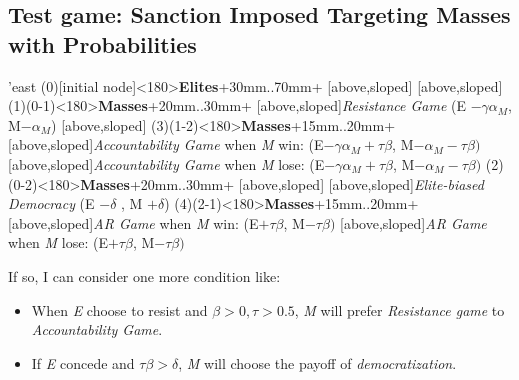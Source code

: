 \documentclass[11pt]{article}
\begin{document}
	\subsection*{Test game: Sanction Imposed Targeting Masses with Probabilities}
	\begin{istgame}[font=\footnotesize]
		\centering
		\setistgrowdirection'{east}
		\xtShowArrows
		\istroot(0)[initial node]<180>{\textbf{Elites}}+30mm..70mm+
		[above,sloped]  [above,sloped] \endist
		\istroot(1)(0-1)<180>{\textbf{Masses}}+20mm..30mm+
		[above,sloped]{\textit{Resistance Game} (E $- \gamma\alpha_{M}$, M$-\alpha_{M}$) }
		[above,sloped]{ }  \endist
		\istroot(3)(1-2)<180>{\textbf{Masses}}+15mm..20mm+
		[above,sloped]{\textit{Accountability Game} when \textit{M} win: (E$-\gamma\alpha_{M}+\tau\beta$, M$-\alpha_{M}-\tau\beta)$}
		[above,sloped]{\textit{Accountability Game} when \textit{M} lose: (E$-\gamma\alpha_{M}+\tau\beta$, M$-\alpha_{M}-\tau\beta)$} \endist
		\istroot(2)(0-2)<180>{\textbf{Masses}}+20mm..30mm+
		[above,sloped]{}
		[above,sloped]{\textit{Elite-biased Democracy} (E $-\delta$ , M $+ \delta$)} \endist
		\istroot(4)(2-1)<180>{\textbf{Masses}}+15mm..20mm+
		[above,sloped]{\textit{AR Game} when \textit{M} win: (E$+\tau\beta$, M$-\tau\beta)$}
		[above,sloped]{\textit{AR Game} when \textit{M} lose: (E$+\tau\beta$, M$-\tau\beta)$} \endist
	\end{istgame}
	
	If so, I can consider one more condition like:
	\begin{itemize}
		\item When \textit{E} choose to resist and $\beta > 0, \tau > 0.5$, \textit{M} will prefer \textit{Resistance game} to \textit{Accountability Game}.
		\item If \textit{E} concede and $\tau\beta > \delta$, \textit{M} will choose the payoff of \textit{democratization}.
	\end{itemize}
	
	
	
	
	
\end{document}
